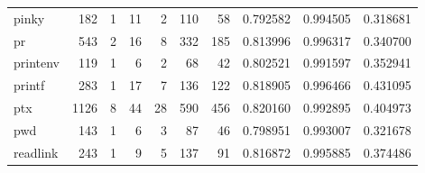 \begin{longtable}{lrrrrrrrrr}
pinky     &                    182 &                                  1 &                                11 &                                2 &                               110 &                              58 &                                0.792582 &                               0.994505 &                             0.318681 \\
pr        &                    543 &                                  2 &                                16 &                                8 &                               332 &                             185 &                                0.813996 &                               0.996317 &                             0.340700 \\
printenv  &                    119 &                                  1 &                                 6 &                                2 &                                68 &                              42 &                                0.802521 &                               0.991597 &                             0.352941 \\
printf    &                    283 &                                  1 &                                17 &                                7 &                               136 &                             122 &                                0.818905 &                               0.996466 &                             0.431095 \\
ptx       &                   1126 &                                  8 &                                44 &                               28 &                               590 &                             456 &                                0.820160 &                               0.992895 &                             0.404973 \\
pwd       &                    143 &                                  1 &                                 6 &                                3 &                                87 &                              46 &                                0.798951 &                               0.993007 &                             0.321678 \\
readlink  &                    243 &                                  1 &                                 9 &                                5 &                               137 &                              91 &                                0.816872 &                               0.995885 &                             0.374486 \\

\end{longtable}
